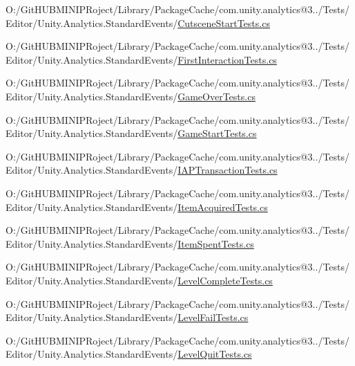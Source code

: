 \begin{DoxyCompactItemize}
O\+:/\+Git\+H\+U\+B\+M\+I\+N\+I\+P\+Roject/\+Library/\+Package\+Cache/com.\+unity.\+analytics@3../\+Tests/\+Editor/\+Unity.\+Analytics.\+Standard\+Events/\mbox{\hyperlink{_cutscene_start_tests_8cs}{Cutscene\+Start\+Tests.\+cs}}\item 
O\+:/\+Git\+H\+U\+B\+M\+I\+N\+I\+P\+Roject/\+Library/\+Package\+Cache/com.\+unity.\+analytics@3../\+Tests/\+Editor/\+Unity.\+Analytics.\+Standard\+Events/\mbox{\hyperlink{_first_interaction_tests_8cs}{First\+Interaction\+Tests.\+cs}}\item 
O\+:/\+Git\+H\+U\+B\+M\+I\+N\+I\+P\+Roject/\+Library/\+Package\+Cache/com.\+unity.\+analytics@3../\+Tests/\+Editor/\+Unity.\+Analytics.\+Standard\+Events/\mbox{\hyperlink{_game_over_tests_8cs}{Game\+Over\+Tests.\+cs}}\item 
O\+:/\+Git\+H\+U\+B\+M\+I\+N\+I\+P\+Roject/\+Library/\+Package\+Cache/com.\+unity.\+analytics@3../\+Tests/\+Editor/\+Unity.\+Analytics.\+Standard\+Events/\mbox{\hyperlink{_game_start_tests_8cs}{Game\+Start\+Tests.\+cs}}\item 
O\+:/\+Git\+H\+U\+B\+M\+I\+N\+I\+P\+Roject/\+Library/\+Package\+Cache/com.\+unity.\+analytics@3../\+Tests/\+Editor/\+Unity.\+Analytics.\+Standard\+Events/\mbox{\hyperlink{_i_a_p_transaction_tests_8cs}{I\+A\+P\+Transaction\+Tests.\+cs}}\item 
O\+:/\+Git\+H\+U\+B\+M\+I\+N\+I\+P\+Roject/\+Library/\+Package\+Cache/com.\+unity.\+analytics@3../\+Tests/\+Editor/\+Unity.\+Analytics.\+Standard\+Events/\mbox{\hyperlink{_item_acquired_tests_8cs}{Item\+Acquired\+Tests.\+cs}}\item 
O\+:/\+Git\+H\+U\+B\+M\+I\+N\+I\+P\+Roject/\+Library/\+Package\+Cache/com.\+unity.\+analytics@3../\+Tests/\+Editor/\+Unity.\+Analytics.\+Standard\+Events/\mbox{\hyperlink{_item_spent_tests_8cs}{Item\+Spent\+Tests.\+cs}}\item 
O\+:/\+Git\+H\+U\+B\+M\+I\+N\+I\+P\+Roject/\+Library/\+Package\+Cache/com.\+unity.\+analytics@3../\+Tests/\+Editor/\+Unity.\+Analytics.\+Standard\+Events/\mbox{\hyperlink{_level_complete_tests_8cs}{Level\+Complete\+Tests.\+cs}}\item 
O\+:/\+Git\+H\+U\+B\+M\+I\+N\+I\+P\+Roject/\+Library/\+Package\+Cache/com.\+unity.\+analytics@3../\+Tests/\+Editor/\+Unity.\+Analytics.\+Standard\+Events/\mbox{\hyperlink{_level_fail_tests_8cs}{Level\+Fail\+Tests.\+cs}}\item 
O\+:/\+Git\+H\+U\+B\+M\+I\+N\+I\+P\+Roject/\+Library/\+Package\+Cache/com.\+unity.\+analytics@3../\+Tests/\+Editor/\+Unity.\+Analytics.\+Standard\+Events/\mbox{\hyperlink{_level_quit_tests_8cs}{Level\+Quit\+Tests.\+cs}}\item 

\end{DoxyCompactItemize}
